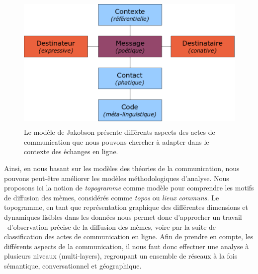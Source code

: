 \begin{figure}[h!]
    \centering

    \includegraphics[width=4.6894in,height=2.6114in]{figures/chap3/chapitre3-img5.png}

    \caption[Modèle de Jakobson]{ Le modèle de Jakobson présente différents aspects des actes de communication que nous pouvons chercher à adapter dans le contexte des échanges en ligne.}

\end{figure}

Ainsi, en nous basant sur les modèles des théories de la communication, nous pouvons peut-\^etre améliorer les modèles méthodologiques d{\textquoteright}analyse. Nous proposons ici la notion de \textit{topogramme }comme modèle pour comprendre les motifs de diffusion des mèmes, considérés comme \textit{topos} ou \textit{lieux communs. }Le topogramme, en tant que représentation graphique des différentes dimensions et dynamiques lisibles dans les données nous permet donc d{\textquoteright}approcher un travail \ d{\textquoteright}observation précise de la diffusion des mèmes, voire par la suite de classification des actes de communication en ligne. Afin de prendre en compte, les différents aspects de la communication, il nous faut donc effectuer une analyse à plusieurs niveaux (multi-layers), regroupant un ensemble de réseaux à la fois sémantique, conversationnel et géographique.